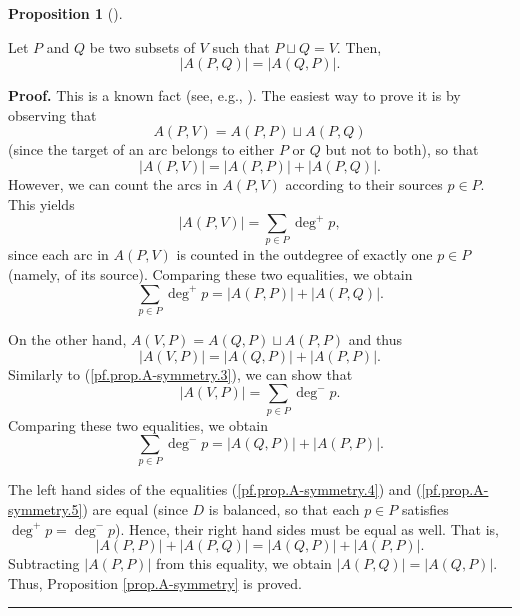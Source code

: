 \documentclass[numbers=enddot,12pt,final,onecolumn,notitlepage]{scrartcl}%
\theoremstyle{definition}
\newtheorem{prop}[theo]{Proposition}
\newenvironment{proposition}[1][]
{\begin{prop}[#1]\begin{leftbar}}
{\end{leftbar}\end{prop}}
\newenvironment{proof}[1][Proof]{\noindent\textbf{#1.} }{\ \rule{0.5em}{0.5em}}
\let\sumnonlimits\sum
\renewcommand{\sum}{\sumnonlimits\limits}
\theoremstyle{plainsl}
\begin{document}
\begin{proposition}
\label{prop.A-symmetry}Let $P$ and $Q$ be two subsets of $V$ such that
$P\sqcup Q=V$. Then,
\[
\left\vert A\left(  P,Q\right)  \right\vert =\left\vert A\left(  Q,P\right)
\right\vert .
\]

\end{proposition}

\begin{proof}
This is a known fact (see, e.g., \cite[Exercise 9.1]{22s}). The easiest way to
prove it is by observing that%
\[
A\left(  P,V\right)  =A\left(  P,P\right)  \sqcup A\left(  P,Q\right)
\]
(since the target of an arc belongs to either $P$ or $Q$ but not to both), so
that%
\[
\left\vert A\left(  P,V\right)  \right\vert =\left\vert A\left(  P,P\right)
\right\vert +\left\vert A\left(  P,Q\right)  \right\vert .
\]
However, we can count the arcs in $A\left(  P,V\right)  $ according to their
sources $p\in P$. This yields%
\begin{equation}
\left\vert A\left(  P,V\right)  \right\vert =\sum_{p\in P}\deg^{+}p,
\label{pf.prop.A-symmetry.3}%
\end{equation}
since each arc in $A\left(  P,V\right)  $ is counted in the outdegree of
exactly one $p\in P$ (namely, of its source). Comparing these two equalities,
we obtain%
\begin{equation}
\sum_{p\in P}\deg^{+}p=\left\vert A\left(  P,P\right)  \right\vert +\left\vert
A\left(  P,Q\right)  \right\vert . \label{pf.prop.A-symmetry.4}%
\end{equation}


\noindent On the other hand, $A\left(  V,P\right)  =A\left(  Q,P\right)
\sqcup A\left(  P,P\right)  $ and thus%
\[
\left\vert A\left(  V,P\right)  \right\vert =\left\vert A\left(  Q,P\right)
\right\vert +\left\vert A\left(  P,P\right)  \right\vert .
\]
Similarly to (\ref{pf.prop.A-symmetry.3}), we can show that%
\[
\left\vert A\left(  V,P\right)  \right\vert =\sum_{p\in P}\deg^{-}p.
\]
Comparing these two equalities, we obtain%
\begin{equation}
\sum_{p\in P}\deg^{-}p=\left\vert A\left(  Q,P\right)  \right\vert +\left\vert
A\left(  P,P\right)  \right\vert . \label{pf.prop.A-symmetry.5}%
\end{equation}


The left hand sides of the equalities (\ref{pf.prop.A-symmetry.4}) and
(\ref{pf.prop.A-symmetry.5}) are equal (since $D$ is balanced, so that each
$p\in P$ satisfies $\deg^{+}p=\deg^{-}p$). Hence, their right hand sides must
be equal as well. That is,%
\[
\left\vert A\left(  P,P\right)  \right\vert +\left\vert A\left(  P,Q\right)
\right\vert =\left\vert A\left(  Q,P\right)  \right\vert +\left\vert A\left(
P,P\right)  \right\vert .
\]
Subtracting $\left\vert A\left(  P,P\right)  \right\vert $ from this equality,
we obtain $\left\vert A\left(  P,Q\right)  \right\vert =\left\vert A\left(
Q,P\right)  \right\vert $. Thus, Proposition \ref{prop.A-symmetry} is proved.
\end{proof}
\end{document}

